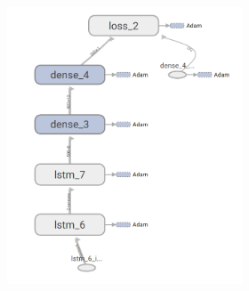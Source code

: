 \begin{figure}
\begin{subfigure}[b]{0.3\linewidth}
\begin{subfigure}[b]{\linewidth}
		\end{subfigure}
	\end{subfigure}
	\begin{subfigure}[b]{0.3\linewidth}
		\begin{subfigure}[b]{\linewidth}
			\includegraphics[width=\linewidth]{plots/rnn-candidates-2-lstm-2-dense.png}
		\end{subfigure}
	\end{subfigure}
	\begin{subfigure}[b]{0.3\linewidth}
		\begin{subfigure}[b]{\linewidth}

\end{subfigure}
\end{subfigure}
\end{figure}
